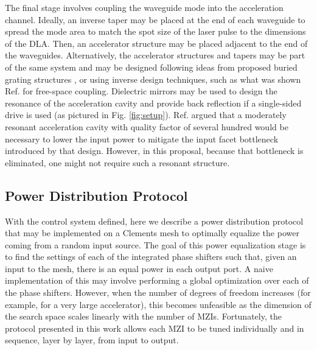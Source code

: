 The final stage involves coupling the waveguide mode into the acceleration channel.  Ideally, an inverse taper may be placed at the end of each waveguide to spread the mode area to match the spot size of the laser pulse to the dimensions of the DLA.  Then, an accelerator structure may be placed adjacent to the end of the waveguides.  Alternatively, the accelerator structures and tapers may be part of the same system and may be designed following ideas from proposed buried grating structures \cite{chang_silicon_2014}, or using inverse design techniques, such as what was shown Ref. \cite{hughes_method_2017} for free-space coupling.  Dielectric mirrors may be used to design the resonance of the acceleration cavity and provide back reflection if a single-sided drive is used \cite{yousefi2019dielectric} (as pictured in Fig. \ref{fig:setup}).  Ref. \cite{hughes_-chip_2018} argued that a moderately resonant acceleration cavity with quality factor of several hundred would be necessary to lower the input power to mitigate the input facet bottleneck introduced by that design.  However, in this proposal, because that bottleneck is eliminated, one might not require such a resonant structure.

\subsection{\label{sec:algo}Power Distribution Protocol}

With the control system defined, here we describe a power distribution protocol that may be implemented on a Clements mesh to optimally equalize the power coming from a random input source.  The goal of this power equalization stage is to find the settings of each of the integrated phase shifters such that, given an input to the mesh, there is an equal power in each output port.  A naive implementation of this may involve performing a global optimization over each of the phase shifters.  However, when the number of degrees of freedom increases (for example, for a very large accelerator), this becomes unfeasible as the dimension of the search space scales linearly with the number of MZIs. Fortunately, the protocol presented in this work allows each MZI to be tuned individually and in sequence, layer by layer, from input to output.

